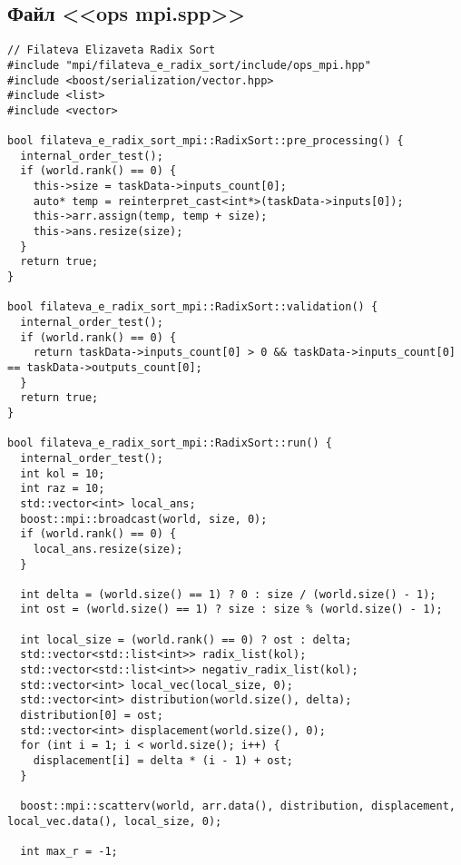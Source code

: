 \documentclass[a4paper, 14pt]{article}
\begin{document}
	\subsection*{\centering Файл <<ops mpi.spp>>}
	\begin{verbatim}
// Filateva Elizaveta Radix Sort
#include "mpi/filateva_e_radix_sort/include/ops_mpi.hpp"
#include <boost/serialization/vector.hpp>
#include <list>
#include <vector>

bool filateva_e_radix_sort_mpi::RadixSort::pre_processing() {
  internal_order_test();
  if (world.rank() == 0) {
    this->size = taskData->inputs_count[0];
    auto* temp = reinterpret_cast<int*>(taskData->inputs[0]);
    this->arr.assign(temp, temp + size);
    this->ans.resize(size);
  }
  return true;
}

bool filateva_e_radix_sort_mpi::RadixSort::validation() {
  internal_order_test();
  if (world.rank() == 0) {
    return taskData->inputs_count[0] > 0 && taskData->inputs_count[0] == taskData->outputs_count[0];
  }
  return true;
}

bool filateva_e_radix_sort_mpi::RadixSort::run() {
  internal_order_test();
  int kol = 10;
  int raz = 10;
  std::vector<int> local_ans;
  boost::mpi::broadcast(world, size, 0);
  if (world.rank() == 0) {
    local_ans.resize(size);
  }

  int delta = (world.size() == 1) ? 0 : size / (world.size() - 1);
  int ost = (world.size() == 1) ? size : size % (world.size() - 1);

  int local_size = (world.rank() == 0) ? ost : delta;
  std::vector<std::list<int>> radix_list(kol);
  std::vector<std::list<int>> negativ_radix_list(kol);
  std::vector<int> local_vec(local_size, 0);
  std::vector<int> distribution(world.size(), delta);
  distribution[0] = ost;
  std::vector<int> displacement(world.size(), 0);
  for (int i = 1; i < world.size(); i++) {
    displacement[i] = delta * (i - 1) + ost;
  }

  boost::mpi::scatterv(world, arr.data(), distribution, displacement, local_vec.data(), local_size, 0);

  int max_r = -1;


\end{verbatim}
\end{document}
